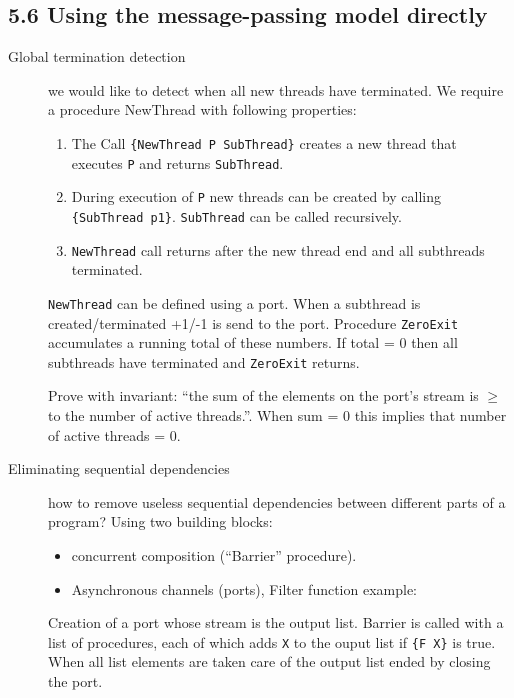 \subsection{5.6 Using the message-passing model directly}

\begin{description}
  \item[Global termination detection] we would like to detect when all new threads have terminated.
    We require a procedure NewThread with following properties:
    \begin{enumerate}
      \item The Call \lstinline|{NewThread P SubThread}| creates a new thread that executes \lstinline|P| and returns \lstinline|SubThread|.
      \item During execution of \lstinline|P| new threads can be created by calling \lstinline|{SubThread p1}|.
        \lstinline|SubThread| can be called recursively.
      \item \lstinline|NewThread| call returns after the new thread end and all subthreads terminated.
    \end{enumerate}

    \lstinline|NewThread| can be defined using a port.
    When a subthread is created/terminated +1/-1 is send to the port.
    Procedure \lstinline|ZeroExit| accumulates a running total of these numbers.
    If total = 0 then all subthreads have terminated and \lstinline|ZeroExit| returns.

    Prove with invariant: ``the sum of the elements on the port's stream is $\geq$ to the number of active threads.''.
    When sum = 0 this implies that number of active threads = 0.

  \item[Eliminating sequential dependencies] how to remove useless sequential dependencies between different parts of a program? Using two building blocks:
    \begin{itemize}
      \item concurrent composition (``Barrier'' procedure).
      \item Asynchronous channels (ports), Filter function example:
    \end{itemize}
    Creation of a port whose stream is the output list.
    Barrier is called with a list of procedures, each of which adds \lstinline|X| to the ouput list if \lstinline|{F X}| is true.
    When all list elements are taken care of the output list ended by closing the port.
\end{description}


